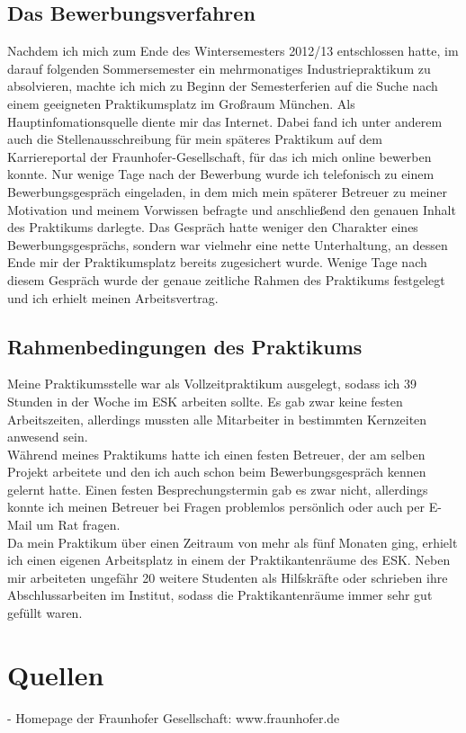 \documentclass[a4paper]{scrartcl}
\begin{document}
\subsection{Das Bewerbungsverfahren}
\label{sec:das-bewerb}

Nachdem ich mich zum Ende des Wintersemesters 2012/13 entschlossen hatte, im darauf folgenden Sommersemester ein mehrmonatiges Industriepraktikum zu absolvieren, machte ich mich zu Beginn der Semesterferien auf die Suche nach einem geeigneten Praktikumsplatz im Großraum München.  Als Hauptinfomationsquelle diente mir das Internet. Dabei fand ich unter anderem auch die Stellenausschreibung für mein späteres Praktikum auf dem Karriereportal der Fraunhofer-Gesellschaft, für das ich mich online bewerben konnte. Nur wenige Tage nach der Bewerbung wurde ich telefonisch zu einem Bewerbungsgespräch eingeladen, in dem mich mein späterer Betreuer zu meiner Motivation und meinem Vorwissen befragte und anschließend den genauen Inhalt des Praktikums darlegte. Das Gespräch hatte weniger den Charakter eines Bewerbungsgesprächs, sondern war vielmehr eine nette Unterhaltung, an dessen Ende mir der Praktikumsplatz bereits zugesichert wurde.  Wenige Tage nach diesem Gespräch wurde der genaue zeitliche Rahmen des Praktikums festgelegt und ich erhielt meinen Arbeitsvertrag. 


\subsection{Rahmenbedingungen des Praktikums}
\label{sec:rahm-des-prakt}

Meine Praktikumsstelle war als Vollzeitpraktikum ausgelegt, sodass ich 39 Stunden in der Woche im ESK arbeiten sollte. Es gab zwar keine festen Arbeitszeiten, allerdings mussten alle Mitarbeiter in bestimmten Kernzeiten anwesend sein. \\
Während meines Praktikums hatte ich einen festen Betreuer, der am selben Projekt arbeitete und den ich auch schon beim Bewerbungsgespräch kennen gelernt hatte. Einen festen Besprechungstermin gab es zwar nicht, allerdings konnte ich meinen Betreuer bei Fragen problemlos persönlich oder auch per E-Mail um Rat fragen.  \\
Da mein Praktikum über einen Zeitraum von mehr als fünf Monaten ging, erhielt ich einen eigenen Arbeitsplatz in einem der Praktikantenräume des ESK. Neben mir arbeiteten ungefähr 20 weitere Studenten als Hilfskräfte oder schrieben ihre Abschlussarbeiten im Institut, sodass die Praktikantenräume immer sehr gut gefüllt waren.  



\section{Quellen}
\label{sec:quellen}

- Homepage der Fraunhofer Gesellschaft: www.fraunhofer.de
\end{document}
